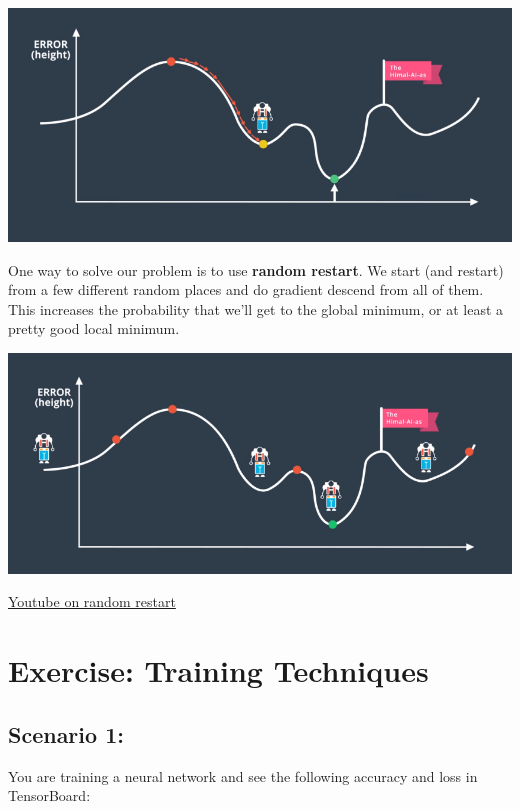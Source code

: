 \includegraphics[width=0.75\linewidth]{img//intro//trainingNN/training-considerations-13.png}

One way to solve our problem is to use \textbf{random restart}. We start (and restart) from a few different random places and do gradient descend from all of them. This increases the probability that we'll get to the global minimum, or at least a pretty good local minimum. 

\includegraphics[width=0.75\linewidth]{img//intro//trainingNN/training-considerations-15.png}

\href{https://www.youtube.com/watch?v=idyBBCzXiqg&t=1s&ab_channel=Udacity}{Youtube on random restart}


\section{Exercise: Training Techniques}

\subsection{Scenario 1:}

You are training a neural network and see the following accuracy and loss in TensorBoard:

